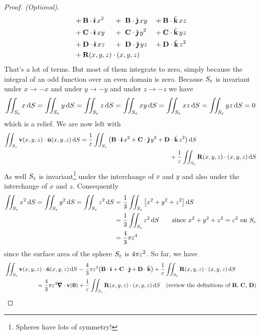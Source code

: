 \begin{proof}[Proof. (Optional)]
\begin{alignat*}{5}
&+\vB\cdot\hi\,x^2
&&+\ \vB\cdot\hj\,xy
&&+\vB\cdot\hk\,xz \\ 
&+\vC\cdot\hi\,xy 
&&+\ \vC\cdot\hj\,y^2
&&+\vC\cdot\hk\,yz \\ 
&+\vD\cdot\hi\,xz\ 
&&+\ \vD\cdot\hj\,yz
&&+\vD\cdot\hk\,z^2 \\ 
&+\vR(x,y,z)\cdot (x,y,z)\hidewidth
\end{alignat*}
That's a lot of terms. But most of them integrate to zero, simply
because the integral of an odd function over an even domain is zero.
Because $S_\varepsilon$ is invariant under $x\rightarrow -x$ and under
$y\rightarrow -y$ and under $z\rightarrow -z$ we have
\begin{align*}
\iint_{S_\varepsilon} x\,\mathrm{d}S
=\iint_{S_\varepsilon} y\,\mathrm{d}S
=\iint_{S_\varepsilon} z\,\mathrm{d}S
=\iint_{S_\varepsilon} xy\,\mathrm{d}S
=\iint_{S_\varepsilon} xz\,\mathrm{d}S
=\iint_{S_\varepsilon} yz\,\mathrm{d}S
=0
\end{align*}
which is a relief. We are now left with 
\begin{align*}
\iint_{S_\varepsilon}\mathbf{v}(x,y,z)\cdot\hat{\mathbf{n}}(x,y,z)\,\mathrm{d}S
&= \frac{1}{\varepsilon} \iint_{S_\varepsilon}\big(
    \mathbf{B}\cdot\hat{\pmb{\imath}}\,x^2 +\mathbf{C}\cdot\hat{\pmb{\jmath}}\,y^2 +\mathbf{D}\cdot\hat{\mathbf{k}}\, z^2 
     \big)\,\mathrm{d}S \\&\hskip2in
+\frac{1}{\varepsilon} \iint_{S_\varepsilon}\mathbf{R}(x,y,z)\cdot (x,y,z)\,\mathrm{d}S
\end{align*}
As well $S_\varepsilon$ is invariant\footnote{Spheres have lots of symmetry!} 
under the interchange of $x$ and $y$
and also under the interchange of $x$ and $z$. Consequently
\begin{align*}
\iint_{S_\varepsilon} x^2\,\mathrm{d}S
=\iint_{S_\varepsilon} y^2\,\mathrm{d}S
=\iint_{S_\varepsilon} z^2\,\mathrm{d}S
&=\frac{1}{3}\iint_{S_\varepsilon}\big[x^2+y^2+ z^2\big]\,\mathrm{d}S \\
&=\frac{1}{3}\iint_{S_\varepsilon}\varepsilon^2\,\mathrm{d}S 
\qquad\text{since $x^2+y^2+z^2=\varepsilon^2$ on $S_\varepsilon$}\\
&=\frac{4}{3}\pi\varepsilon^4
\end{align*}
since the surface area of the sphere $S_\varepsilon$ is $4\pi\varepsilon^2$.
So far, we have
\begin{align*}
&\dblInt_{S_\veps}\vv(x,y,z)\cdot\hn(x,y,z)\,\dee{S}
= \frac{4}{3}\pi\veps^3 \big(\vB\cdot\hi +\vC\cdot\hj +\vD\cdot\hk\big)
+\frac{1}{\veps} \dblInt_{S_\veps}\vR(x,y,z)\cdot (x,y,z)\,\dee{S} \\
&\hskip0.75in= \frac{4}{3}\pi\veps^3 \vnabla\cdot\vv(\vZero)
+\frac{1}{\veps} \dblInt_{S_\veps}\vR(x,y,z)\cdot (x,y,z)\,\dee{S} 
\quad\text{(review the definitions of $\vB$, $\vC$, $\vD$)}
\end{align*}

\end{proof}
